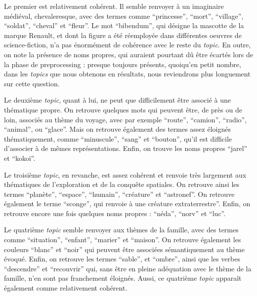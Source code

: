 \documentclass[letterpaper,portrait,12pt]{article}
\begin{document}
	Le premier est relativement coh\'{e}rent. Il semble renvoyer \`{a} un imaginaire m\'{e}di\'{e}val, chevaleresque, avec des termes comme {``}princesse'', {``}mort'', {``}village'', {``}soldat'', {``}cheval'' et {``}fleur''. Le mot {``}bibendum'', qui d\'{e}signe la mascotte de la marque Renault, et dont la figure a \'{e}t\'{e} r\'{e}employ\'{e}e dans diff\'{e}rentes oeuvres de science-fiction, n'a pas \'{e}norm\'{e}ment de coh\'{e}rence avec le reste du \emph{topic}. En outre, on note la pr\'{e}sence de noms propres, qui auraient pourtant d\^{u} \^{e}tre \'{e}cart\'{e}s lors de la phase de preprocessing : presque toujours pr\'{e}sents, quoiqu'en petit nombre, dans les \emph{topics} que nous obtenons en r\'{e}sultats, nous reviendrons plus longuement sur cette question.





	Le deuxi\`{e}me \emph{topic}, quant \`{a} lui, ne peut que difficilement \^{e}tre associ\'{e} \`{a} une th\'{e}matique propre. On retrouve quelques mots qui peuvent \^{e}tre, de pr\`{e}s ou de loin, associ\'{e}s au th\`{e}me du voyage, avec par exemple {``}route'', {``}camion'', {``}radio'', {``}animal'', ou {``}glace''. Mais on retrouve \'{e}galement des termes assez \'{e}loign\'{e}s th\'{e}matiquement, comme {``}minuscule'', {``}sang'' et {``}bouton'', qu'il est difficile d'associer \`{a} de m\^{e}mes repr\'{e}sentations. Enfin, on trouve les noms propres {``}jarel'' et {``}kokoï''.





	Le troisi\`{e}me \emph{topic}, en revanche, est assez coh\'{e}rent et renvoie tr\`{e}s largement aux th\'{e}matiques de l'exploration et de la conqu\^{e}te spatiales. On retrouve ainsi les termes {``}plan\`{e}te'', {``}espace'', {``}humain'', {``}cr\'{e}ature'' et {``}astronef''. On retrouve \'{e}galement le terme {``}sconge'', qui renvoie \`{a} une cr\'{e}ature extraterrestre''. Enfin, on retrouve encore une fois quelques noms propres : {``}n\'{e}da'', {``}norv'' et {``}luc''.





	Le quatri\`{e}me \emph{topic} semble renvoyer aux th\`{e}mes de la famille, avec des termes comme {``}situation'', {``}enfant'', {``}marier'' et {``}maison''. On retrouve \'{e}galement les couleurs {``}blanc'' et {``}noir'' qui peuvent \^{e}tre associ\'{e}es s\'{e}mantiquement au th\`{e}me \'{e}voqu\'{e}. Enfin, on retrouve les termes {``}sable'', et {``}ombre'', ainsi que les verbes {``}descendre'' et {``}recouvrir'' qui, sans \^{e}tre en pleine ad\'{e}quation avec le th\`{e}me de la famille, n'en sont pas franchement \'{e}loign\'{e}s. Aussi, ce quatri\`{e}me \emph{topic} appara\^{i}t \'{e}galement comme relativement coh\'{e}rent.
\end{document}
